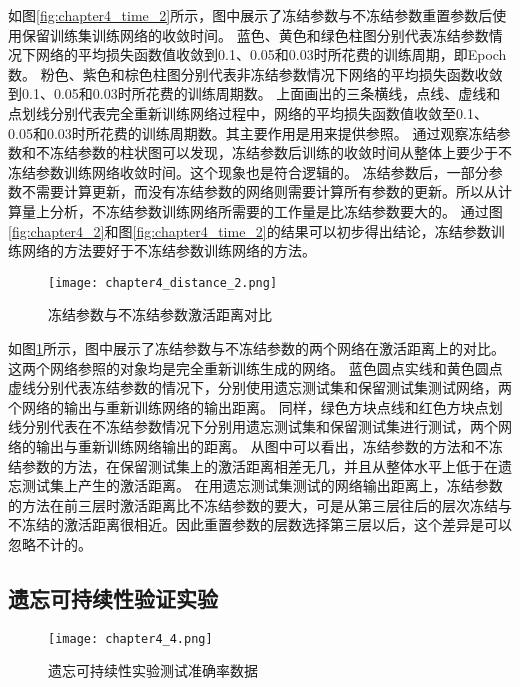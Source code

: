 如图\ref{fig:chapter4_time_2}所示，图中展示了冻结参数与不冻结参数重置参数后使用保留训练集训练网络的收敛时间。
蓝色、黄色和绿色柱图分别代表冻结参数情况下网络的平均损失函数值收敛到0.1、0.05和0.03时所花费的训练周期，即Epoch数。
粉色、紫色和棕色柱图分别代表非冻结参数情况下网络的平均损失函数收敛到0.1、0.05和0.03时所花费的训练周期数。
上面画出的三条横线，点线、虚线和点划线分别代表完全重新训练网络过程中，网络的平均损失函数值收敛至0.1、0.05和0.03时所花费的训练周期数。其主要作用是用来提供参照。
通过观察冻结参数和不冻结参数的柱状图可以发现，冻结参数后训练的收敛时间从整体上要少于不冻结参数训练网络收敛时间。这个现象也是符合逻辑的。
冻结参数后，一部分参数不需要计算更新，而没有冻结参数的网络则需要计算所有参数的更新。所以从计算量上分析，不冻结参数训练网络所需要的工作量是比冻结参数要大的。
通过图\ref{fig:chapter4_2}和图\ref{fig:chapter4_time_2}的结果可以初步得出结论，冻结参数训练网络的方法要好于不冻结参数训练网络的方法。
\begin{figure}
    \centering
    \texttt{[image: chapter4\_distance\_2.png]}
    \caption{冻结参数与不冻结参数激活距离对比}
    \label{fig:chapter4_distance_2}
\end{figure}

如图\ref{fig:chapter4_distance_2}所示，图中展示了冻结参数与不冻结参数的两个网络在激活距离上的对比。这两个网络参照的对象均是完全重新训练生成的网络。
蓝色圆点实线和黄色圆点虚线分别代表冻结参数的情况下，分别使用遗忘测试集和保留测试集测试网络，两个网络的输出与重新训练网络的输出距离。
同样，绿色方块点线和红色方块点划线分别代表在不冻结参数情况下分别用遗忘测试集和保留测试集进行测试，两个网络的输出与重新训练网络输出的距离。
从图中可以看出，冻结参数的方法和不冻结参数的方法，在保留测试集上的激活距离相差无几，并且从整体水平上低于在遗忘测试集上产生的激活距离。
在用遗忘测试集测试的网络输出距离上，冻结参数的方法在前三层时激活距离比不冻结参数的要大，可是从第三层往后的层次冻结与不冻结的激活距离很相近。因此重置参数的层数选择第三层以后，这个差异是可以忽略不计的。


\subsection{遗忘可持续性验证实验}
\begin{figure}
    \centering
    \texttt{[image: chapter4\_4.png]}
    \caption{遗忘可持续性实验测试准确率数据}
    \label{fig:chapter4_4}
\end{figure}

